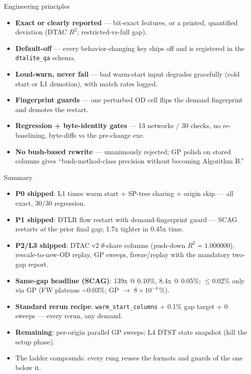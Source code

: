 \documentclass[10pt]{beamer}
\newcommand{\code}[1]{\texttt{#1}}
\begin{document}
\begin{frame}{Engineering principles}
  \begin{itemize}
    \item \textbf{Exact or clearly reported} --- bit-exact features, or a
      printed, quantified deviation (DTAC $R^2$; restricted-vs-full gap).
    \item \textbf{Default-off} --- every behavior-changing key ships off and is
      registered in the \code{dtalite\_qa} schema.
    \item \textbf{Loud-warn, never fail} --- bad warm-start input degrades
      gracefully (cold start or L1 demotion), with match rates logged.
    \item \textbf{Fingerprint guards} --- one perturbed OD cell flips the
      demand fingerprint and demotes the restart.
    \item \textbf{Regression + byte-identity gates} --- 13 networks / 30
      checks, no re-baselining, byte-diffs vs the pre-change exe.
    \item \textbf{No bush-based rewrite} --- unanimously rejected; GP polish on
      stored columns gives ``bush-method-class precision without becoming
      Algorithm B.''
  \end{itemize}
\end{frame}

\begin{frame}{Summary}
  \begin{itemize}
    \item \textbf{P0 shipped}: L1 times warm start + SP-tree sharing +
      origin skip --- all exact, 30/30 regression.
    \item \textbf{P1 shipped}: DTLR flow restart with demand-fingerprint
      guard --- SCAG restarts \emph{at} the prior final gap; 1.7x tighter in
      0.45x time.
    \item \textbf{P2/L3 shipped}: DTAC v2 $\theta$-share columns (push-down
      $R^2 = 1.000000$), rescale-to-new-OD replay, GP sweeps, freeze/replay
      with the mandatory two-gap report.
    \item \textbf{Same-gap headline (SCAG)}: 139x @ 0.10\%, 8.4x @ 0.05\%;
      $\leq$0.02\% only via GP (FW plateaus $\sim$0.03\%; GP $\to$
      $8\times10^{-4}$\,\%).
    \item \textbf{Standard rerun recipe}: \code{warm\_start\_columns} +
      0.1\% gap target + 0 sweeps --- every rerun, any demand.
    \item \textbf{Remaining}: per-origin parallel GP sweeps; L4 DTST state
      snapshot (kill the setup phase).
    \item The ladder compounds: every rung reuses the formats and guards of
      the one below it.
  \end{itemize}
\end{frame}
\end{document}
